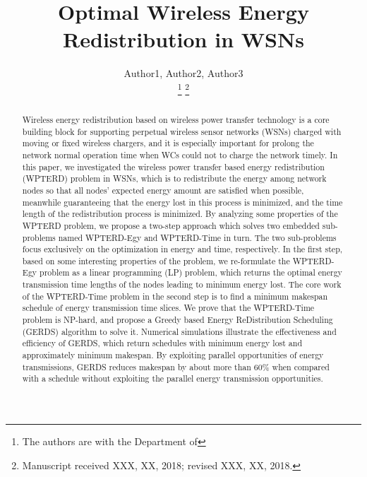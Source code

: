 \documentclass[journal,10pt]{IEEEtran}
\begin{document}
\title{Optimal Wireless Energy Redistribution in WSNs}


\author{Author1, Author2, Author3

\thanks{The authors are with the Department of }%
\thanks{Manuscript received XXX, XX, 2018; revised XXX, XX, 2018.}}

{}


\maketitle


\begin{abstract}
Wireless energy redistribution based on wireless power transfer technology is a core building block for supporting perpetual wireless sensor networks (WSNs) charged with moving or fixed wireless chargers, and it is especially important for prolong the network normal operation time when WCs could not to charge the network timely. In this paper, we investigated the wireless power transfer based energy redistribution (WPTERD) problem in WSNs, which is to redistribute the energy among network nodes so that all nodes' expected energy amount are satisfied when possible, meanwhile guaranteeing that the energy lost in this process is minimized, and the time length of the redistribution process is minimized. By analyzing some properties of the WPTERD problem, we propose a two-step approach which solves two embedded sub-problems named WPTERD-Egy and WPTERD-Time in turn. The two sub-problems focus exclusively on the optimization in energy and time, respectively. In the first step, based on some interesting properties of the problem, we re-formulate the WPTERD-Egy problem as a linear programming (LP) problem, which returns the optimal energy transmission time lengths of the nodes leading to minimum energy lost. The core work of the WPTERD-Time problem in the second step is to find a minimum makespan schedule of energy transmission time slices. We prove that the WPTERD-Time problem is NP-hard, and propose a Greedy based Energy ReDistribution Scheduling (GERDS) algorithm to solve it. Numerical simulations illustrate the effectiveness and efficiency of GERDS, which return schedules with minimum energy lost and approximately minimum makespan. By exploiting parallel opportunities of energy transmissions, GERDS reduces makespan by about more than 60\% when compared with a schedule without exploiting the parallel energy transmission opportunities.
\end{abstract}
\end{document}
